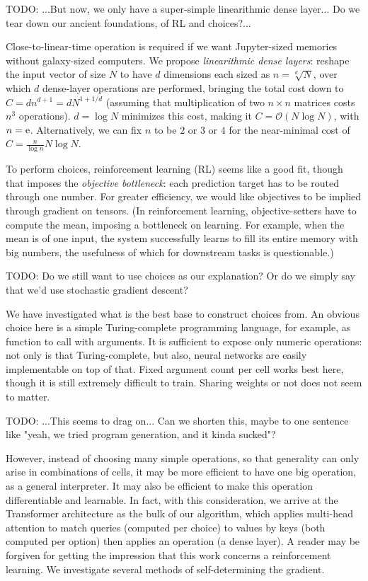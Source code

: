 \documentclass{article}
\begin{document}
    TODO: ...But now, we only have a super-simple linearithmic dense layer... Do we tear down our ancient foundations, of RL and choices?...

Close-to-linear-time operation is required if we want Jupyter-sized memories without galaxy-sized computers. We propose \textit{linearithmic dense layers}: reshape the input vector of size $N$ to have $d$ dimensions each sized as $n=\sqrt[d]{N}$, over which $d$ dense-layer operations are performed, bringing the total cost down to $C=dn^{d+1}=d N^{1+1/d}$ (assuming that multiplication of two $n \times n$ matrices costs $n^3$ operations). $d=\log{N}$ minimizes this cost, making it $C=\mathcal{O}(N \log{N})$, with $n={\rm e}$. Alternatively, we can fix $n$ to be $2$ or $3$ or $4$ for the near-minimal cost of $C=\frac{n}{\log{n}} N \log{N}$.

To perform choices, reinforcement learning (RL) seems like a good fit, though that imposes the \textit{objective bottleneck}: each prediction target has to be routed through one number. For greater efficiency, we would like objectives to be implied through gradient on tensors. (In reinforcement learning, objective-setters have to compute the mean, imposing a bottleneck on learning. For example, when the mean is of one input, the system successfully learns to fill its entire memory with big numbers, the usefulness of which for downstream tasks is questionable.)

    TODO: Do we still want to use choices as our explanation? Or do we simply say that we'd use stochastic gradient descent?

We have investigated what is the best base to construct choices from. An obvious choice here is a simple Turing-complete programming language, for example, as function to call with arguments. It is sufficient to expose only numeric operations: not only is that Turing-complete, but also, neural networks are easily implementable on top of that. Fixed argument count per cell works best here, though it is still extremely difficult to train. Sharing weights or not does not seem to matter.

    TODO: ...This seems to drag on... Can we shorten this, maybe to one sentence like "yeah, we tried program generation, and it kinda sucked"?

However, instead of choosing many simple operations, so that generality can only arise in combinations of cells, it may be more efficient to have one big operation, as a general interpreter. It may also be efficient to make this operation differentiable and learnable. In fact, with this consideration, we arrive at the Transformer architecture \cite{vaswani2017attention} as the bulk of our algorithm, which applies multi-head attention to match queries (computed per choice) to values by keys (both computed per option) then applies an operation (a dense layer). A reader may be forgiven for getting the impression that this work concerns a reinforcement learning. We investigate several methods of self-determining the gradient.
\end{document}
